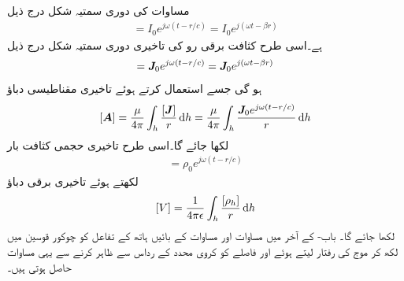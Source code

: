 مساوات  کی دوری سمتیہ شکل درج ذیل
\begin{align}
[I]=I_0 e^{j \omega (t-r/c)}=I_0 e^{j(\omega t-\beta r)}
\end{align}
ہے۔اسی طرح کثافت برقی رو کی تاخیری دوری سمتیہ شکل درج ذیل
\begin{align}
[\kvec{J}]=\kvec{J}_0 e^{j \omega (t-r/c)}=\kvec{J}_0 e^{j(\omega  t -\beta r)}
\end{align}
ہو گی جسے استعمال کرتے ہوئے تاخیری مقناطیسی دباؤ
\begin{align}\label{مساوات_اینٹینا_تاخیری_سمتی_دباو}
[\kvec{A}]=\frac{\mu}{4\pi}\int_h \frac{[\kvec{J}]}{r}\dif h=\frac{\mu}{4\pi}\int_h \frac{\kvec{J}_0 e^{j\omega(t-r/c)}}{r} \dif h
\end{align}
لکھا جائے گا۔اسی طرح تاخیری حجمی کثافت بار
\begin{align}
[\rho_h]= \rho_0 e^{j\omega \left(t-r/c \right)}
\end{align}
لکھتے ہوئے تاخیری برقی دباؤ
\begin{align}\label{مساوات_اینٹینا_تاخیری_غیر_سمتی_دباو}
[V]=\frac{1}{4\pi \epsilon}\int_h \frac{[\rho_h]}{ r} \dif h
\end{align}
لکھا جائے گا۔ باب- کے آخر میں مساوات  اور مساوات  کے بائیں ہاتھ کے تفاعل کو چوکور قوسین میں لکھ کر موج کی رفتار  لیتے ہوئے اور فاصلے  کو کروی محدد کے رداس  سے ظاہر کرنے سے  یہی مساوات حاصل ہوتی ہیں۔

